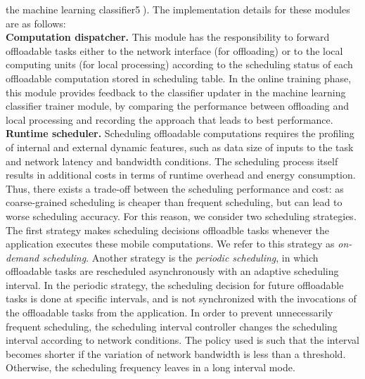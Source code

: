 \documentclass[10pt, conference, compsocconf]{IEEEtran}
\begin{document}
the machine learning classifier{\textcircled{5}).
%
The implementation details for these modules are as follows: \\
%
\textbf{Computation dispatcher.} This module has the
responsibility to forward offloadable tasks either to the
network interface (for offloading) or to the local computing units (for
local processing) according to the scheduling status of each offloadable
computation stored in scheduling table.
%
In the online training phase, this module provides feedback to the
classifier updater in the machine learning classifier trainer module, by
comparing the performance between offloading and local processing and
recording the approach that leads to best performance.\\
%
\textbf{Runtime scheduler.} Scheduling offloadable computations
requires the profiling of internal and external dynamic features, such
as data size of inputs to the task and network latency and bandwidth
conditions.
%
The scheduling process itself results in additional costs in terms of
runtime overhead and energy consumption.
%
Thus, there exists a trade-off between the scheduling performance and
cost: as coarse-grained scheduling is cheaper than frequent
scheduling, but can lead to worse scheduling accuracy.    
%
For this reason, we consider two scheduling strategies.
The first strategy makes scheduling decisions offloadble tasks whenever the
application executes these mobile computations.
%
We refer to this strategy as \textit{on-demand scheduling}.
%
Another strategy is the \textit{periodic scheduling}, in which
offloadable tasks are rescheduled asynchronously with an adaptive
scheduling interval.
%
In the periodic strategy, the scheduling decision for future offloadable
tasks is done at specific intervals, and is not synchronized with the
invocations of the offloadable tasks from the application.
%
In order to prevent unnecessarily frequent scheduling, the
scheduling interval controller changes the scheduling interval according
to network conditions. The policy used is such that the interval becomes shorter if the
variation of network bandwidth is less than a threshold.
Otherwise, the scheduling frequency leaves in a long interval mode.
}
\end{document}
